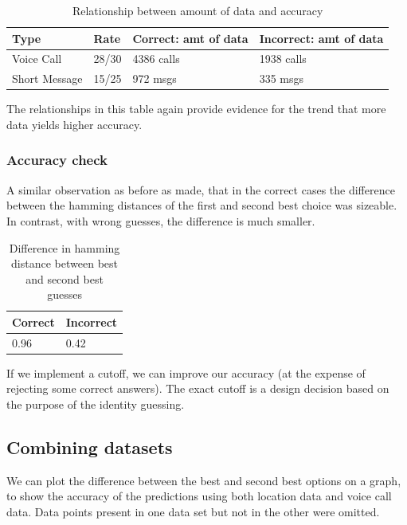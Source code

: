 \documentclass[pageno]{jpaper}
\begin{document}
\begin{table}[h!]
  \centering
  \begin{tabular}{|l|l|l|l|}
    \hline
    \textbf{Type} & \textbf{Rate} & \textbf{Correct: amt of data} & \textbf{Incorrect: amt of data}\\
    \hline
    \hline
    Voice Call &  28/30 & 4386 calls & 1938 calls\\
    \hline
    Short Message & 15/25 & 972 msgs & 335 msgs\\
    \hline
  \end{tabular}
  \caption{Relationship between amount of data and accuracy}
  \label{table:formatting}
\end{table}

The relationships in this table again provide evidence for the trend that more data yields higher accuracy.

\subsubsection{Accuracy check}

A similar observation as before as made, that in the correct cases the difference between the hamming distances of the first and second best choice was sizeable. In contrast, with wrong guesses, the difference is much smaller. 

\begin{table}[h!]
  \centering
  \begin{tabular}{|l|l|}
    \hline
    \textbf{Correct} & \textbf{Incorrect}\\
    \hline
    \hline
    0.96 &  0.42\\
    \hline
  \end{tabular}
  \caption{Difference in hamming distance between best and second best guesses}
  \label{table:formatting}
\end{table}

If we implement a cutoff, we can improve our accuracy (at the expense of rejecting some correct answers). The exact cutoff is a design decision based on the purpose of the identity guessing.

\subsection{Combining datasets}

We can plot the difference between the best and second best options on a graph, to show the accuracy of the predictions using both location data and voice call data. Data points present in one data set but not in the other were omitted. 
\end{document}
